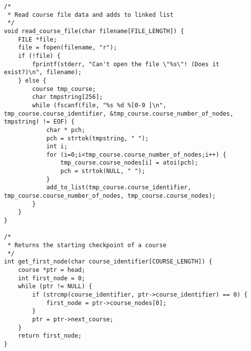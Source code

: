\documentclass[pdftex,12pt,a4paper]{article}
\begin{document}
\begin{verbatim}
/*
 * Read course file data and adds to linked list
 */
void read_course_file(char filename[FILE_LENGTH]) {
    FILE *file;
    file = fopen(filename, "r");
    if (!file) {
        fprintf(stderr, "Can't open the file \"%s\"! (Does it exist?)\n", filename);
    } else {
        course tmp_course;
        char tmpstring[256];
        while (fscanf(file, "%s %d %[0-9 ]\n", tmp_course.course_identifier, &tmp_course.course_number_of_nodes, tmpstring) != EOF) {
            char * pch;
            pch = strtok(tmpstring, " ");
            int i;
            for (i=0;i<tmp_course.course_number_of_nodes;i++) {
                tmp_course.course_nodes[i] = atoi(pch);
                pch = strtok(NULL, " ");
            }
            add_to_list(tmp_course.course_identifier, tmp_course.course_number_of_nodes, tmp_course.course_nodes);
        }
    }
}

/*
 * Returns the starting checkpoint of a course
 */
int get_first_node(char course_identifier[COURSE_LENGTH]) {
    course *ptr = head;
    int first_node = 0;
    while (ptr != NULL) {
        if (strcmp(course_identifier, ptr->course_identifier) == 0) {
            first_node = ptr->course_nodes[0];
        }
        ptr = ptr->next_course;
    }
    return first_node;
}
\end{verbatim}
\end{document}
